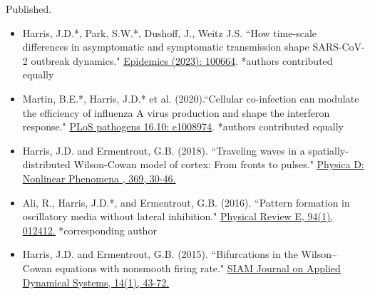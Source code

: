 \documentclass[a4paper,10pt]{article}
\newlength{\cvcolumngapwidth}
\newlength{\cvleftcolumnwidth}
\newlength{\cvrightcolumnwidth}
\newcommand{\cvtitlestyle}[1]{{\large\cvtitlefont\textcolor{cvtitlecolor}{#1}}}
\newcommand{\cvdurationstyle}[1]{{\small\cvdurationfont\textcolor{cvdurationcolor}{#1}}}
\newlength{\cvafteritemskipamount}
\newlength{\cvaftertitleskipamount}
\newlength{\cvparskip}
\newcommand{\cvitem}[2]{
            \begin{minipage}[t]{\cvleftcolumnwidth}
                \raggedleft #1
            \end{minipage}%
            \hspace{\cvcolumngapwidth}%
            \begin{minipage}[t]{\cvrightcolumnwidth}
                \setlength{\parskip}{\cvparskip} #2
            \end{minipage}
        
            \vspace{\cvafteritemskipamount}
        }
\newcommand{\cvtitle}[1]{
            \cvtitlestyle{#1}
        
            \vspace{\cvaftertitleskipamount}
            \vspace{-\cvparskip}
        }
\begin{document}
        \newpage 
        \cvitem{
            \cvdurationstyle{Published.}
        }{
            \begin{itemize}[leftmargin=*]
                        	\item Harris, J.D.*, Park, S.W.*, Dushoff, J., Weitz J.S. ``How time-scale differences in asymptomatic and symptomatic transmission shape SARS-CoV-2 outbreak dynamics." 
	\href{https://www.sciencedirect.com/science/article/pii/S1755436522001049}{\underline{Epidemics (2023): 100664}}. *authors contributed equally \\
	
                	\item Martin, B.E.*, Harris, J.D.* et al. (2020).``Cellular co-infection can modulate the efficiency of influenza A virus production and shape the interferon response." \href{https://doi.org/10.1371/journal.ppat.1008974}{\underline{PLoS pathogens 16.10: e1008974}}. *authors contributed equally \\
	
        	        \item  Harris, J.D. and Ermentrout, G.B. (2018). ``Traveling waves in a spatially-distributed Wilson-Cowan model of cortex: From fronts to pulses." \href{https://doi.org/10.1016/j.physd.2017.12.011}{\underline{Physica D: Nonlinear Phenomena , 369, 30-46.}}
            \end{itemize}
        }    	
        \cvitem{
            \cvdurationstyle{}
        }{	
        	\newpage
        \begin{itemize}[leftmargin=*]	
                \item Ali, R., Harris, J.D.*, and Ermentrout, G.B. (2016). ``Pattern formation in oscillatory media without lateral inhibition." \href{https://doi.org/10.1103/PhysRevE.94.012412}{\underline{Physical Review E, 94(1), 012412.}}  *corresponding author \\ 
                \item Harris, J.D. and Ermentrout, G.B. (2015). ``Bifurcations in the Wilson--Cowan equations with nonsmooth firing rate." \href{https://doi.org/10.1137/140977953}{\underline{SIAM Journal on Applied Dynamical Systems, 14(1), 43-72. }}
            \end{itemize}
        
        }
        
\end{document}

